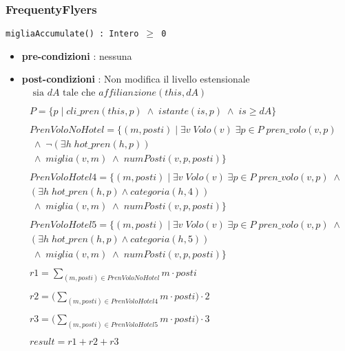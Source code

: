 \documentclass[12pt, letterpaper]{article}
\newcommand{\code}[1]{\colorbox{light-gray}{\texttt{#1}}}
\begin{document}
\subsubsection{FrequentyFlyers}
\code{migliaAccumulate() : Intero $\ge$ 0}\begin{itemize}
    \item \textbf{pre-condizioni} : nessuna 
    \item \textbf{post-condizioni} : Non modifica il livello estensionale $$\begin{matrix} 
       \text{ sia }dA \text{ tale che }affilianzione(this,dA) \\ \\ 
        P = \{ p \;|\; cli\_pren(this,p)\; \land \;istante(is,p) \;\land \;is \ge dA\}\\ \\
        PrenVoloNoHotel = \big\{ (m,posti) \;|\;  \exists v \; Volo(v) \; \exists p\in P\;pren\_volo(v,p)\\ \;\land\;
         \lnot(\exists h\; hot\_pren(h,p))\\ \;\land\; miglia(v,m) \;\land \; numPosti(v,p,posti)\big\} \\ \\ 
        PrenVoloHotel4 = \big\{  (m,posti) \;|\;  \exists v \; Volo(v) \; \exists p\in P\;pren\_volo(v,p) 
        \;\land\; \\(\exists h\; hot\_pren(h,p) \land categoria(h,4))\\ \;\land\; miglia(v,m) \;\land \; numPosti(v,p,posti)\big\}\\ \\
        PrenVoloHotel5 = \big\{  (m,posti) \;|\;  \exists v \; Volo(v) \; \exists p\in P\;pren\_volo(v,p) 
        \;\land\;\\ (\exists h\; hot\_pren(h,p) \land categoria(h,5))\\ \;\land\; miglia(v,m) \;\land \; numPosti(v,p,posti)\big\}\\ \\  
        r1 = \displaystyle \sum_{(m,posti)\in PrenVoloNoHotel}m\cdot posti\\ \\ 
        r2 = \displaystyle \Big(\sum_{(m,posti)\in PrenVoloHotel4}m\cdot posti \Big)\cdot 2 \\ \\ 
        r3 = \displaystyle \Big(\sum_{(m,posti)\in PrenVoloHotel5}m\cdot posti \Big)\cdot 3\\ \\ 
        result = r1+r2+r3
    \end{matrix}$$
\end{itemize}\newpage
\end{document}
